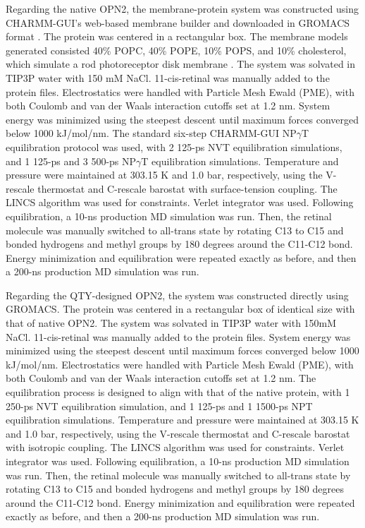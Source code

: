 \documentclass[fleqn,10pt,lineno]{manuscript}
\begin{document}
Regarding the native OPN2, the membrane-protein system was constructed using CHARMM-GUI’s web-based membrane builder and downloaded in GROMACS format \citep{Jo_2008, Wu_2014, Lee_2016}. The protein was centered in a rectangular box. The membrane models generated consisted 40\% POPC, 40\% POPE, 10\% POPS, and 10\% cholesterol, which simulate a rod photoreceptor disk membrane \citep{Albert_2005}. The system was solvated in TIP3P water with 150 mM NaCl. 11-cis-retinal was manually added to the protein files. Electrostatics were handled with Particle Mesh Ewald (PME), with both Coulomb and van der Waals interaction cutoffs set at 1.2 nm. System energy was minimized using the steepest descent until maximum forces converged below 1000 kJ/mol/nm. The standard six-step CHARMM-GUI NP$\gamma$T equilibration protocol \citep{Jo_2008} was used, with 2 125-ps NVT equilibration simulations, and 1 125-ps and 3 500-ps NP$\gamma$T equilibration simulations. Temperature and pressure were maintained at 303.15 K and 1.0 bar, respectively, using the V-rescale thermostat and C-rescale barostat with surface-tension coupling. The LINCS algorithm was used for constraints. Verlet integrator was used. Following equilibration, a 10-ns production MD simulation was run. Then, the retinal molecule was manually switched to all-trans state by rotating C13 to C15 and bonded hydrogens and methyl groups by 180 degrees around the C11-C12 bond. Energy minimization and equilibration were repeated exactly as before, and then a 200-ns production MD simulation was run. 

Regarding the QTY-designed OPN2, the system was constructed directly using GROMACS. The protein was centered in a rectangular box of identical size with that of native OPN2. The system was solvated in TIP3P water with 150mM NaCl. 11-cis-retinal was manually added to the protein files. System energy was minimized using the steepest descent until maximum forces converged below 1000 kJ/mol/nm. Electrostatics were handled with Particle Mesh Ewald (PME), with both Coulomb and van der Waals interaction cutoffs set at 1.2 nm. The equilibration process is designed to align with that of the native protein, with 1 250-ps NVT equilibration simulation, and 1 125-ps and 1 1500-ps NPT equilibration simulations. Temperature and pressure were maintained at 303.15 K and 1.0 bar, respectively, using the V-rescale thermostat and C-rescale barostat with isotropic coupling. The LINCS algorithm was used for constraints. Verlet integrator was used. Following equilibration, a 10-ns production MD simulation was run. Then, the retinal molecule was manually switched to all-trans state by rotating C13 to C15 and bonded hydrogens and methyl groups by 180 degrees around the C11-C12 bond. Energy minimization and equilibration were repeated exactly as before, and then a 200-ns production MD simulation was run. 
\end{document}
